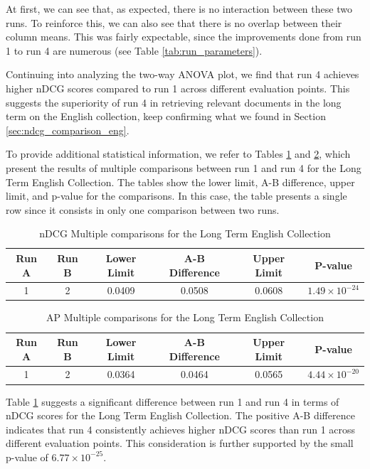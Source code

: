 At first, we can see that, as expected, there is no interaction between these two runs. To reinforce this, we can also see that there is no overlap between their column means.
This was fairly expectable, since the improvements done from run 1 to run 4 are numerous (see Table \ref{tab:run_parameters}).

Continuing into analyzing the two-way \ac{ANOVA} plot, we find that run 4 achieves higher \ac{nDCG} scores compared to run 1 across different evaluation points.
This suggests the superiority of run 4 in retrieving relevant documents in the long term on the English collection, keep confirming what we found in Section \ref{sec:ndcg_comparison_eng}.

To provide additional statistical information, we refer to Tables \ref{table:lt_anova_eng} and \ref{table:lt_anova_eng_ap}, which present the results of multiple comparisons between run 1 and run 4 for the Long Term English Collection.
The tables show the lower limit, A-B difference, upper limit, and p-value for the comparisons.
In this case, the table presents a single row since it consists in only one comparison between two runs.

\begin{table}[!h]
    \centering
    \caption{\ac{nDCG} Multiple comparisons for the Long Term English Collection}
    \label{table:lt_anova_eng}
    \begin{tabular}{cccccc}
    \hline
    Run A & Run B & Lower Limit & A-B Difference & Upper Limit & P-value \\
    \hline
    1 & 2 & 0.0409 & 0.0508 & 0.0608 & $1.49 \times 10^{-24}$ \\
    \hline
    \end{tabular}
\end{table}

\begin{table}[!h]
    \centering
    \caption{\ac{AP} Multiple comparisons for the Long Term English Collection}
    \label{table:lt_anova_eng_ap}
    \begin{tabular}{cccccc}
    \hline
    Run A & Run B & Lower Limit & A-B Difference & Upper Limit & P-value \\
    \hline
    1 & 2 & 0.0364 & 0.0464 & 0.0565 & $4.44 \times 10^{-20}$ \\
    \hline
    \end{tabular}
\end{table}

Table \ref{table:lt_anova_eng} suggests a significant difference between run 1 and run 4 in terms of \ac{nDCG} scores for the Long Term English Collection.
The positive A-B difference indicates that run 4 consistently achieves higher \ac{nDCG} scores than run 1 across different evaluation points. This consideration is further supported by the small p-value of $6.77 \times 10^{-25}$.

